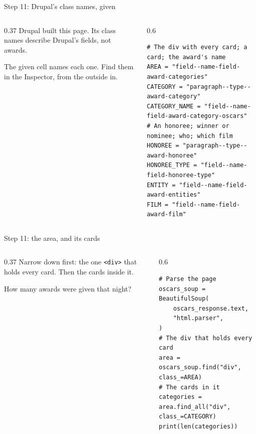\documentclass[9pt,aspectratio=169]{beamer}
\begin{document}
\begin{frame}[fragile]{Step 11: Drupal's class names, given}
    \begin{columns}[T]
        \begin{column}{0.37\textwidth}
            Drupal built this page. Its class names describe Drupal's fields, not awards.

            \medskip
            The given cell names each one. Find them in the Inspector, from the outside in.
        \end{column}
        \begin{column}{0.6\textwidth}
\begin{lstlisting}
# The div with every card; a card; the award's name
AREA = "field--name-field-award-categories"
CATEGORY = "paragraph--type--award-category"
CATEGORY_NAME = "field--name-field-award-category-oscars"
# An honoree; winner or nominee; who; which film
HONOREE = "paragraph--type--award-honoree"
HONOREE_TYPE = "field--name-field-honoree-type"
ENTITY = "field--name-field-award-entities"
FILM = "field--name-field-award-film"
\end{lstlisting}
        \end{column}
    \end{columns}
\end{frame}

\begin{frame}[fragile]{Step 11: the area, and its cards}
    \begin{columns}[T]
        \begin{column}{0.37\textwidth}
            Narrow down first: the one \texttt{<div>} that holds every card. Then the cards inside it.

            \medskip
            How many awards were given that night?
        \end{column}
        \begin{column}{0.6\textwidth}
\begin{lstlisting}
# Parse the page
oscars_soup = BeautifulSoup(
    oscars_response.text,
    "html.parser",
)
# The div that holds every card
area = oscars_soup.find("div", class_=AREA)
# The cards in it
categories = area.find_all("div", class_=CATEGORY)
print(len(categories))
\end{lstlisting}
        \end{column}
    \end{columns}
\end{frame}
\end{document}
